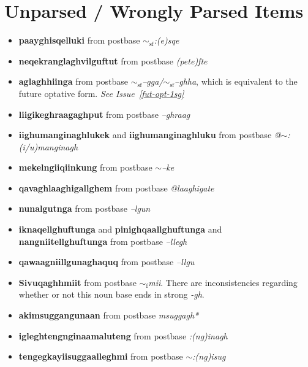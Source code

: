 \documentclass{article}
\begin{document}
\section{Unparsed / Wrongly Parsed Items}
\begin{itemize}
\item \textbf{paayghisqelluki} from postbase \textit{$\sim_\text{sf}$:(e)sqe}

\item \textbf{neqekranglaghvilguftut} from postbase \textit{(pete)fte}

\item \textbf{aglaghhiinga} from postbase \textit{$\sim_\text{sf}$--gga/$\sim_\text{sf}$--ghha}, which is equivalent to the future optative form. \textit{See Issue~\ref{fut-opt-1sg}}

\item \textbf{liigikeghraagaghput} from postbase \textit{--ghraag}

\item \textbf{iighumanginaghlukek} and \textbf{iighumanginaghluku} from postbase \textit{@$\sim$:(i/u)manginagh}

\item \textbf{mekelngiiqiinkung} from postbase \textit{$\sim$--ke}

\item \textbf{qavaghlaaghigallghem} from postbase \textit{@laaghigate}

\item \textbf{nunalgutnga} from postbase \textit{--lgun}

\item \textbf{iknaqellghuftunga} and \textbf{pinighqaallghuftunga} and \textbf{nangniitellghuftunga} from postbase \textit{--llegh}

\item \textbf{qawaagniillgunaghaquq} from postbase \textit{--llgu}

\item \textbf{Sivuqaghhmiit} from postbase \textit{$\sim_\text{f}$mii}. There are inconsistencies regarding whether or not this noun base ends in strong \textit{-gh}.

\item \textbf{akimsuggangunaan} from postbase \textit{msuggagh*}

\item \textbf{igleghtengnginaamaluteng} from postbase \textit{:(ng)inagh}

\item \textbf{tengegkayiisuggaalleghmi} from postbase \textit{$\sim$:(ng)isug}


\end{itemize}
\end{document}
